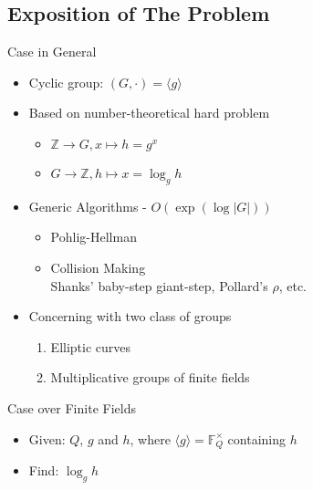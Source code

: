 \documentclass{beamer}
\begin{document}
	\subsection{Exposition of The Problem}
		\begin{frame}{Case in General}
			\begin{itemize}
				\item
					Cyclic group: $(G, \cdot) = \langle g\rangle$
					\pause
				\item
					Based on number-theoretical hard problem
					\pause
					\begin{itemize}
						\item
							$\mathbb{Z} \rightarrow G, x \mapsto h = g^x$
						\item
							$G \rightarrow \mathbb{Z}, h \mapsto x = \log_g{h}$
					\end{itemize}
					\pause
				\item
					Generic Algorithms - $O(\exp(\log|G|))$\\
					\begin{itemize}
						\item
							Pohlig-Hellman
						\item
							Collision Making\\
							Shanks' baby-step giant-step, Pollard's $\rho$, etc.
					\end{itemize}
					\pause
				\item
					Concerning with two class of groups
						\begin{enumerate}
							\item
								Elliptic curves
							\item
								\alert{Multiplicative groups of finite fields}
						\end{enumerate}
			\end{itemize}
		\end{frame}
		
		\begin{frame}{Case over Finite Fields}
			\begin{itemize}
				\item
					Given: $Q$, $g$ and $h$, where $\langle g\rangle = \mathbb{F}_Q^\times$ containing $h$
				\item
					Find: $\log_gh$
			\end{itemize}
		\end{frame}
\end{document}

